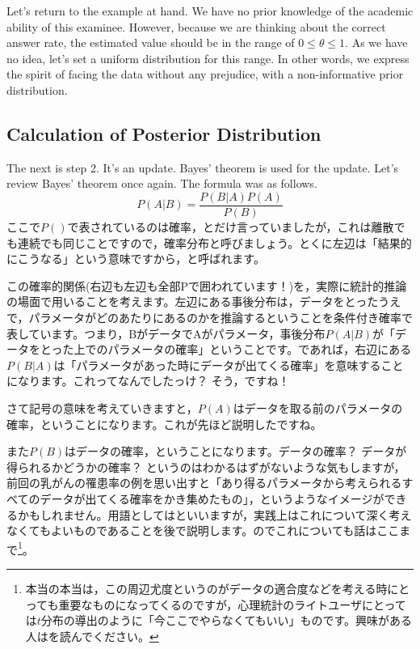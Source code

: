 \documentclass{ltjsbook}
\begin{document}
Let's return to the example at hand. We have no prior knowledge of the academic ability of this examinee. However, because we are thinking about the correct answer rate, the estimated value should be in the range of $0 \le \theta \le 1$. As we have no idea, let's set a uniform distribution for this range. In other words, we express the spirit of facing the data without any prejudice, with a non-informative prior distribution.


\subsection{Calculation of Posterior Distribution}
The next is step 2. It's an update. Bayes' theorem is used for the update. Let's review Bayes' theorem once again. The formula was as follows.
\[ P(A|B) = \frac{P(B|A)P(A)}{P(B)}\]
ここで$P()$で表されているのは確率，とだけ言っていましたが，これは離散でも連続でも同じことですので，確率分布と呼びましょう。とくに左辺は「結果的にこうなる」という意味ですから，と呼ばれます。

この確率的関係(右辺も左辺も全部Pで囲われています！)を，実際に統計的推論の場面で用いることを考えます。左辺にある事後分布は，データをとったうえで，パラメータがどのあたりにあるのかを推論するということを条件付き確率で表しています。つまり，BがデータでAがパラメータ，事後分布$P(A|B)$が「データをとった上でのパラメータの確率」ということです。であれば，右辺にある$P(B|A)$は「パラメータがあった時にデータが出てくる確率」を意味することになります。これってなんでしたっけ？ そう，ですね！

さて記号の意味を考えていきますと，$P(A)$はデータを取る前のパラメータの確率，ということになります。これが先ほど説明したですね。

また$P(B)$はデータの確率，ということになります。データの確率？ データが得られるかどうかの確率？ というのはわかるはずがないような気もしますが，前回の乳がんの罹患率の例を思い出すと「あり得るパラメータから考えられるすべてのデータが出てくる確率をかき集めたもの」，というようなイメージができるかもしれません。用語としてはといいますが，実践上はこれについて深く考えなくてもよいものであることを後で説明します。のでこれについても話はここまで\footnote{本当の本当は，この周辺尤度というのがデータの適合度などを考える時にとっても重要なものになってくるのですが，心理統計のライトユーザにとっては$t$分布の導出のように「今ここでやらなくてもいい」ものです。興味がある人は\textcite{Hamada201912}を読んでください。}。
\end{document}
